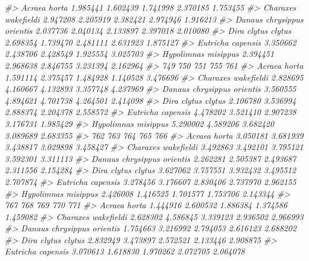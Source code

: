 \documentclass[
]{article}
\newenvironment{Shaded}{\begin{snugshade}}{\end{snugshade}}
\newcommand{\CommentTok}[1]{\textcolor[rgb]{0.56,0.35,0.01}{\textit{#1}}}
\begin{document}
\begin{Shaded}
\begin{Highlighting}[]
\CommentTok{\#\textgreater{} Acraea horta               1.985441 1.602439 1.741998 2.370185 1.753455}
\CommentTok{\#\textgreater{} Charaxes wakefieldi        2.947208 2.205919 2.382421 2.974946 1.916213}
\CommentTok{\#\textgreater{} Danaus chrysippus orientis 2.037736 2.040134 2.133897 2.397018 2.010080}
\CommentTok{\#\textgreater{} Dira clytus clytus         2.698354 1.739470 2.481111 2.631923 1.875127}
\CommentTok{\#\textgreater{} Eutricha capensis          3.350662 2.438706 2.428549 1.925554 3.025703}
\CommentTok{\#\textgreater{} Hypolimnas misippus        2.394451 2.968638 2.846755 3.231394 2.162964}
\CommentTok{\#\textgreater{}                                 749      750      751      755      761}
\CommentTok{\#\textgreater{} Acraea horta               1.591114 2.375457 1.484928 1.140528 3.476696}
\CommentTok{\#\textgreater{} Charaxes wakefieldi        2.828695 4.160667 4.132893 3.357748 4.237969}
\CommentTok{\#\textgreater{} Danaus chrysippus orientis 3.560555 4.894621 4.701738 4.264501 2.414098}
\CommentTok{\#\textgreater{} Dira clytus clytus         2.106780 3.536994 2.888374 2.204378 2.558572}
\CommentTok{\#\textgreater{} Eutricha capensis          4.478202 3.521410 2.907238 3.176731 1.985429}
\CommentTok{\#\textgreater{} Hypolimnas misippus        5.290002 4.589206 3.682420 3.089689 2.683355}
\CommentTok{\#\textgreater{}                                 762      763      764      765      766}
\CommentTok{\#\textgreater{} Acraea horta               3.050181 3.681939 3.438817 3.029898 3.458427}
\CommentTok{\#\textgreater{} Charaxes wakefieldi        3.492863 3.492101 3.795121 3.592301 3.311113}
\CommentTok{\#\textgreater{} Danaus chrysippus orientis 2.262281 2.505387 2.493687 2.311556 2.154284}
\CommentTok{\#\textgreater{} Dira clytus clytus         3.627062 3.757551 3.932432 3.495512 2.707874}
\CommentTok{\#\textgreater{} Eutricha capensis          3.278456 3.176607 2.830406 2.737970 2.962155}
\CommentTok{\#\textgreater{} Hypolimnas misippus        2.426008 1.416525 1.701577 1.753706 2.143344}
\CommentTok{\#\textgreater{}                                 767      768      769      770      771}
\CommentTok{\#\textgreater{} Acraea horta               1.444916 2.600532 1.886384 1.374586 1.459082}
\CommentTok{\#\textgreater{} Charaxes wakefieldi        2.628302 4.586845 3.339123 2.936502 2.966993}
\CommentTok{\#\textgreater{} Danaus chrysippus orientis 1.754663 3.216992 2.794053 2.616123 2.688202}
\CommentTok{\#\textgreater{} Dira clytus clytus         2.832949 3.473897 2.572521 2.133446 2.908875}
\CommentTok{\#\textgreater{} Eutricha capensis          3.070613 1.618830 1.970262 2.072705 2.064078}

\end{Highlighting}
\end{Shaded}
\end{document}
